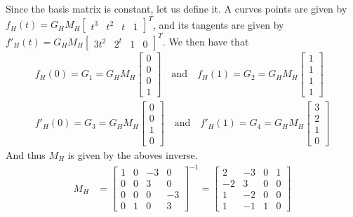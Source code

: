 \documentclass[11pt]{article}
\begin{document}
Since the basis matrix is constant, let us define it. A curves points are
given by $f_H(t) = G_H M_H \begin{bmatrix}t^3 & t^2 & t & 1\end{bmatrix}^T$,
and its tangents are given by $f'_H(t) = G_H M_H \begin{bmatrix}3t^2 & 2^t & 1
& 0\end{bmatrix}^T$. We then have that
\begin{align}
    f_H(0) = G_1 = G_H M_H
    \begin{bmatrix}
        0 \\ 0 \\ 0 \\ 1
    \end{bmatrix}
    \quad
    \text{and}
    \quad
    f_H(1) = G_2 = G_H M_H
    \begin{bmatrix}
        1 \\ 1 \\ 1 \\ 1
    \end{bmatrix}
    \\
    f'_H(0) = G_3 = G_H M_H
    \begin{bmatrix}
        0 \\ 0 \\ 1 \\ 0
    \end{bmatrix}
    \quad
    \text{and}
    \quad
    f'_H(1) = G_4 = G_H M_H
    \begin{bmatrix}
        3 \\ 2 \\ 1 \\ 0
    \end{bmatrix}
\end{align}
And thus $M_H$ is given by the aboves inverse.
\begin{align}
    M_H &=
    \begin{bmatrix}
        1 & 0 & -3 &  0 \\
        0 & 0 &  3 &  0 \\
        0 & 0 &  0 & -3 \\
        0 & 1 &  0 &  3
    \end{bmatrix}^{-1}
    =
    \begin{bmatrix}
         2 & -3 & 0 & 1 \\
        -2 &  3 & 0 & 0 \\
         1 & -2 & 0 & 0 \\
         1 & -1 & 1 & 0
    \end{bmatrix}
\end{align}
\end{document}
